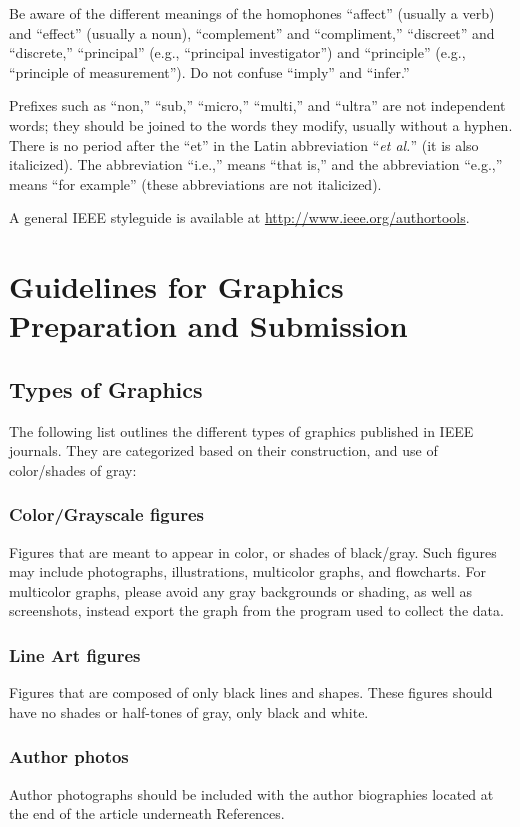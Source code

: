 \documentclass{ieeeaccess}
\begin{document}
Be aware of the different meanings of the homophones ``affect'' (usually a
verb) and ``effect'' (usually a noun), ``complement'' and ``compliment,''
``discreet'' and ``discrete,'' ``principal'' (e.g., ``principal investigator'')
and ``principle'' (e.g., ``principle of measurement''). Do not confuse
``imply'' and ``infer.''

Prefixes such as ``non,'' ``sub,'' ``micro,'' ``multi,'' and ``ultra'' are not
independent words; they should be joined to the words they modify, usually
without a hyphen. There is no period after the ``et'' in the Latin abbreviation
``\emph{et al.}'' (it is also italicized). The abbreviation ``i.e.,'' means
``that is,'' and the abbreviation ``e.g.,'' means ``for example'' (these
abbreviations are not italicized).

A general IEEE styleguide is available at \break
\underline{http://www.ieee.org/authortools}.

\section{Guidelines for Graphics Preparation and Submission}
\label{sec:guidelines}

\subsection{Types of Graphics}
The following list outlines the different types of graphics published in IEEE
journals. They are categorized based on their construction, and use of
color/shades of gray:

\subsubsection{Color/Grayscale figures}
{Figures that are meant to appear in color, or shades of black/gray. Such
	figures may include photographs, illustrations, multicolor graphs, and
	flowcharts. For multicolor graphs, please avoid any gray backgrounds or shading, as well as screenshots, instead export the graph from the program used to collect the data.}

\subsubsection{Line Art figures}
{Figures that are composed of only black lines and shapes. These figures
	should have no shades or half-tones of gray, only black and white.}

\subsubsection{Author photos}
{Author photographs should be included with the author biographies located at the end of the article underneath References. }
\end{document}
